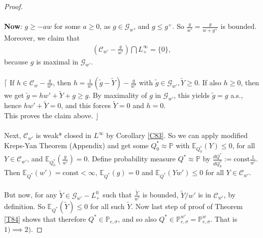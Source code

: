 \documentclass[12pt,a4paper, twoside]{article}
\theoremstyle{definition}
\newcommand{\EE}{\mathbb{E}} %
\newcommand{\PP}{\mathbb{P}} %
\begin{document}
\begin{proof}
\\\\
\textbf{Now}: $g \geq -aw$ for some $a \geq 0$, as $g \in \mathcal{G}_w$, and $g \leq g^+$. So $\frac{g}{w'}= \frac{g}{w+g^+}$ is bounded. Moreover, we claim that 
\begin{align*}
\left( \mathcal{C}_{w'}- \frac{g}{w'}\right) \bigcap L_+^\infty = \{0\},
\end{align*}
because $g$ is maximal in $\mathcal{G}_{w'}$. 
\\\\
$\lceil$ If $h \in \mathcal{C}_w - \frac{g}{w'}$, then $h= \frac{1}{w'}( \widetilde{g}- \widetilde{Y})- \frac{g}{w'}$ with $\widetilde{g} \in \mathcal{G}_{w'}, \widetilde{Y} \geq 0.$ If also $h \geq 0$, then we get $\widetilde{g}= hw' + \widetilde{Y}+g \geq g$. By maximality of $g$ in $\mathcal{G}_{w'}$, this yields $\widetilde{g}=g$ a.s., hence $hw' + \widetilde{Y}=0$, and this forces $\widetilde{Y}=0$ and $h=0$. \\  This proves the claim above. \hfill $\rfloor$ \\
\\
Next, $\mathcal{C}_{w'}$ is weak* closed in $L^\infty$ by Corollary \ref{C83}. So we can apply modified Kreps-Yan Theorem (Appendix) and get some $Q_0^* \approx \PP$ with $\EE_{Q_0^*} (Y) \leq 0$, for all $Y \in \mathcal{C}_{w'}$, and $\EE_{Q_0^*}( \frac{g}{w'}) =0$. Define probability measure $Q^* \approx \PP$ by $\frac{dQ^*}{dQ_0^*}:= \text{const} \frac{1}{w'}$. Then $\EE_{Q^*}(w') = \text{const} < \infty$, $\EE_{Q^*} (g) =0$ and $\EE_{Q^*}(Yw') \leq 0$ for all $Y \in \mathcal{C}_{w'}$. \\
\\
But now, for any $\widetilde{Y} \in \mathcal{G}_{w'} -L_+^0$ such that $\frac{\widetilde{Y}}{w'}$ is bounded, $\widetilde{Y}/w'$ is in $\mathcal{C}_{w'}$, by definition. So $\EE_{Q^*}(\widetilde{Y}) \leq 0$ for all such $\widetilde{Y}$. Now last step of proof of Theorem \ref{T84} shows that therefore $Q^* \in \PP_{e, \sigma}$, and so also $Q^* \in \PP_{e, \sigma}^{w'} = \PP_{e, \sigma}^w$. That is $1) \implies 2)$. 
\end{proof}
\newpage
\end{document}
